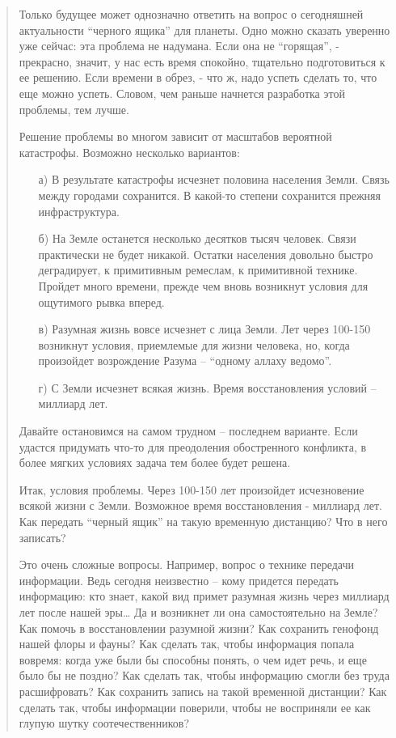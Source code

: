 \documentclass[11pt,a4paper]{article}
\begin{document}
{\begin{quote}
Только будущее может однозначно ответить на вопрос о сегодняшней актуальности
“черного ящика” для планеты. Одно можно сказать уверенно уже сейчас: эта
проблема не надумана. Если она не “горящая”, - прекрасно, значит, у нас есть
время спокойно, тщательно подготовиться к ее решению. Если времени в обрез, -
что ж, надо успеть сделать то, что еще можно успеть. Словом, чем раньше
начнется разработка этой проблемы, тем лучше.

Решение проблемы во многом зависит от масштабов вероятной катастрофы. Возможно
несколько вариантов:
\begin{itemize}[noitemsep]
\item[а)] В результате катастрофы исчезнет половина населения Земли. Связь
  между городами сохранится. В какой-то степени сохранится прежняя
  инфраструктура.
\item[б)] На Земле останется несколько десятков тысяч человек. Связи
  практически не будет никакой. Остатки населения довольно быстро деградирует,
  к примитивным ремеслам, к примитивной технике. Пройдет много времени, прежде
  чем вновь возникнут условия для ощутимого рывка вперед.
\item[в)] Разумная жизнь вовсе исчезнет с лица Земли. Лет через 100-150
  возникнут условия, приемлемые для жизни человека, но, когда произойдет
  возрождение Разума – “одному аллаху ведомо”.
\item[г)] С Земли исчезнет всякая жизнь. Время восстановления условий –
  миллиард лет.
\end{itemize}
Давайте остановимся на самом трудном – последнем варианте. Если удастся
придумать что-то для преодоления обостренного конфликта, в более мягких
условиях задача тем более будет решена.

Итак, условия проблемы. Через 100-150 лет произойдет исчезновение всякой жизни
с Земли. Возможное время восстановления - миллиард лет. Как передать “черный
ящик” на такую временную дистанцию? Что в него записать?

Это очень сложные вопросы. Например, вопрос о технике передачи
информации. Ведь сегодня неизвестно – кому придется передать информацию: кто
знает, какой вид примет разумная жизнь через миллиард лет после нашей эры… Да
и возникнет ли она самостоятельно на Земле? Как помочь в восстановлении
разумной жизни? Как сохранить генофонд нашей флоры и фауны? Как сделать так,
чтобы информация попала вовремя: когда уже были бы способны понять, о чем идет
речь, и еще было бы не поздно? Как сделать так, чтобы информацию смогли без
труда расшифровать? Как сохранить запись на такой временной дистанции? Как
сделать так, чтобы информации поверили, чтобы не восприняли ее как глупую
шутку соотечественников?


\end{quote}}
\end{document}
